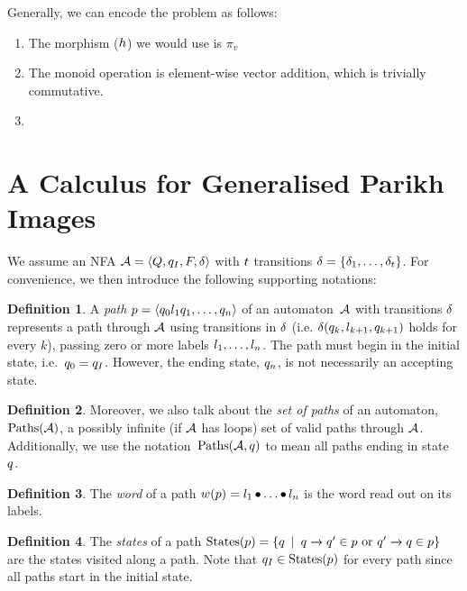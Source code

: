 \documentclass[acmsmall,review,anonymous,screen]{acmart}\settopmatter{printfolios=true,printccs=false,printacmref=true}
\theoremstyle{definition}
\newtheorem{definition}{Definition}[section]
\begin{document}
Generally, we can encode the problem as follows:
\begin{enumerate}
  \item The morphism ($h$) we would use is $\pi_{v}$
  \item The monoid operation is element-wise vector addition, which is trivially commutative.
  \item {}
\end{enumerate}

\section{A Calculus for Generalised Parikh Images}\label{sec:calculus}

We assume an NFA $\mathcal{A} = \left\langle Q, q_I, F, \delta\right\rangle$ with $t$
transitions $\delta =
\left\{\delta_{1} , \ldots , \delta_{t}\right\}$. For convenience, we then introduce the following supporting notations:

\begin{definition}
  A \textit{path} $p = \left\langle q_0 l_1 q_1 , \ldots , q_n\right\rangle$ of an automaton~$\mathcal{A}$ with
  transitions $\delta$ represents a path through $\mathcal{A}$ using
  transitions in $\delta$ (i.e. $\delta(q_k, l_{k+1},
  q_{k+1})$ holds for every $k$), passing zero or more labels $l_1,
  \ldots, l_n$. The path must begin in the initial state, i.e.~$q_0 =
  q_I$. However, the ending state, $q_n$, is not necessarily an
  accepting state.
  \end{definition}

\begin{definition}
  Moreover, we also talk about the \textit{set of paths} of an automaton,
  $\operatorname{Paths}(\mathcal{A})$, a possibly infinite (if $\mathcal{A}$ has loops) set of
  valid paths through $\mathcal{A}$. Additionally, we use the
  notation~$\operatorname{Paths}(\mathcal{A}, q)$ to mean all paths ending in
  state~$q$.
\end{definition}

\begin{definition}
  The \textit{word} of a path $w(p) = l_1 \operatorname{\bullet} \ldots \operatorname{\bullet} l_n$ is
  the word read out on its labels.
\end{definition}

\begin{definition}
  The \textit{states} of a path $\operatorname{States}(p) = \left\{q \:\mid\:
  q \xrightarrow{} q' \in p \text{ or }
  q' \xrightarrow{} q \in p\right\}$ are the states visited along a
  path. Note that $q_I \in \operatorname{States}(p)$ for every path since all
  paths start in the initial state.
\end{definition}
\end{document}
